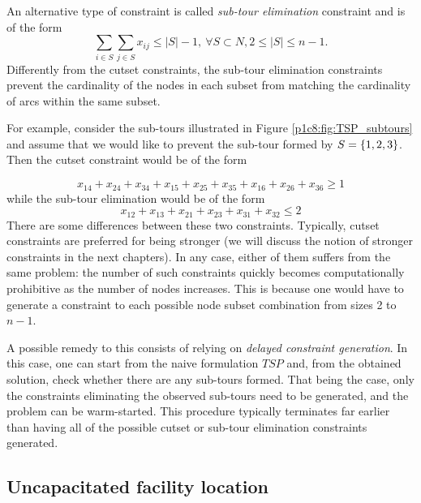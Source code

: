 An alternative type of constraint is called \emph{sub-tour elimination} constraint and is of the form
%
\begin{equation*}
	\sum_{i \in S}\sum_{j \in S}x_{ij} \leq |S|-1, \ \forall S \subset N, 2 \leq |S| \leq n-1. 
\end{equation*}
%
Differently from the cutset constraints, the sub-tour elimination constraints prevent the cardinality of the nodes in each subset from matching the cardinality of arcs within the same subset.

For example, consider the sub-tours illustrated in Figure \ref{p1c8:fig:TSP_subtours} and assume that we would like to prevent the sub-tour formed by $S = \left\{ 1,2,3 \right \}$. Then the cutset constraint would be of the form

\begin{equation*}
	x_{14} + x_{24} + x_{34} + x_{15} + x_{25} + x_{35} + x_{16} + x_{26} + x_{36}\geq 1	
\end{equation*}
%
while the sub-tour elimination would be of the form
\begin{equation*}
	x_{12} + x_{13} + x_{21} + x_{23} + x_{31} + x_{32} \leq 2
\end{equation*}
%
There are some differences between these two constraints. Typically, cutset constraints are preferred for being stronger (we will discuss the notion of stronger constraints in the next chapters). In any case, either of them suffers from the same problem: the number of such constraints quickly becomes computationally prohibitive as the number of nodes increases. This is because one would have to generate a constraint to each possible node subset combination from sizes 2 to $n-1$. 

A possible remedy to this consists of relying on \emph{delayed constraint generation}. In this case, one can start from the naive formulation $TSP$ and, from the obtained solution, check whether there are any sub-tours formed. That being the case, only the constraints eliminating the observed sub-tours need to be generated, and the problem can be warm-started. This procedure typically terminates far earlier than having all of the possible cutset or sub-tour elimination constraints generated. 


\subsection{Uncapacitated facility location}

